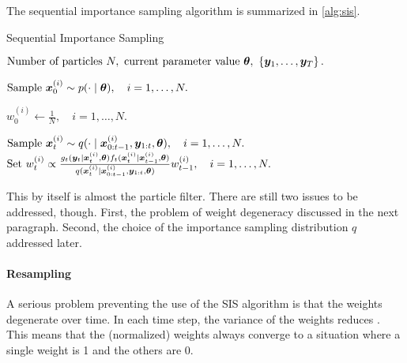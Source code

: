 The sequential importance sampling algorithm is summarized in \autoref{alg:sis}.
\begin{algorithm}[ht]
    \caption{Sequential Importance Sampling}
    \label{alg:sis}
    \begin{algorithmic}[1]
        \Input $\text{Number of particles } N,\ \text{current parameter value } \btheta,\ \left\{\by_1, \ldots, \by_T\right\}.$
        
        \State $\text{Sample } \bm{x}_0^{(i)} \sim p(\cdot \mid \bm{\theta}), \quad i = 1, \ldots, N.$ 
        
        \State $w_0^{(i)} \gets \frac{1}{N}, \quad i = 1, \ldots, N.$ 
        
            \State $\text{Sample } \bm{x}_t^{(i)} \sim q(\cdot \mid \bm{x}_{0:t-1}^{(i)}, \bm{y}_{1:t}, \bm{\theta}), \quad i = 1, \ldots, N.$ 
            \State $\text{Set } w_t^{(i)} \propto \frac{g_t(\bm{y}_t \mid \bm{x}_t^{(i)}, \bm{\theta}) f_t(\bm{x}_t^{(i)} \mid \bm{x}_{t-1}^{(i)}, \bm{\theta})}{q(\bm{x}_t^{(i)} \mid \bm{x}_{0:t-1}^{(i)}, \bm{y}_{1:t}, \bm{\theta})} w_{t-1}^{(i)}, \quad i = 1, \ldots, N.$ 
        \EndFor
    \end{algorithmic}
\end{algorithm}
This by itself is almost the particle filter. There are still two issues to be addressed, though. First, the problem of weight degeneracy discussed in the next paragraph. Second, the choice of the importance sampling distribution $q$ addressed later.


\paragraph{Resampling}
A serious problem preventing the use of the SIS algorithm is that the weights degenerate over time. In each time step, the variance of the weights reduces \citep{particle-filter}. This means that the (normalized) weights always converge to a situation where a single weight is 1 and the others are 0.

